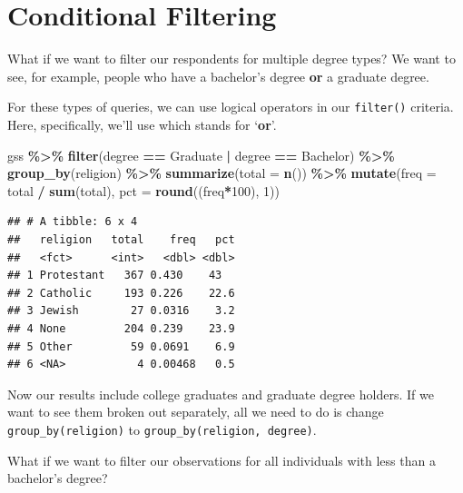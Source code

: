 \documentclass[
]{book}
\newenvironment{Shaded}{\begin{snugshade}}{\end{snugshade}}
\newcommand{\AttributeTok}[1]{\textcolor[rgb]{0.13,0.29,0.53}{#1}}
\newcommand{\DecValTok}[1]{\textcolor[rgb]{0.00,0.00,0.81}{#1}}
\newcommand{\FunctionTok}[1]{\textcolor[rgb]{0.13,0.29,0.53}{\textbf{#1}}}
\newcommand{\NormalTok}[1]{#1}
\newcommand{\SpecialCharTok}[1]{\textcolor[rgb]{0.81,0.36,0.00}{\textbf{#1}}}
\newcommand{\StringTok}[1]{\textcolor[rgb]{0.31,0.60,0.02}{#1}}
\begin{document}
\hypertarget{conditional-filtering}{%
\section{Conditional Filtering}\label{conditional-filtering}}

What if we want to filter our respondents for multiple degree types? We want to see, for example, people who have a bachelor's degree \textbf{or} a graduate degree.

For these types of queries, we can use logical operators in our \texttt{filter()} criteria. Here, specifically, we'll use \texttt{\textbar{}} which stands for `\textbf{or}'.

\begin{Shaded}
\begin{Highlighting}[]
\NormalTok{gss }\SpecialCharTok{\%\textgreater{}\%}
  \FunctionTok{filter}\NormalTok{(degree }\SpecialCharTok{==} \StringTok{\textquotesingle{}Graduate\textquotesingle{}} \SpecialCharTok{|}\NormalTok{ degree }\SpecialCharTok{==} \StringTok{\textquotesingle{}Bachelor\textquotesingle{}}\NormalTok{) }\SpecialCharTok{\%\textgreater{}\%}
  \FunctionTok{group\_by}\NormalTok{(religion) }\SpecialCharTok{\%\textgreater{}\%}
  \FunctionTok{summarize}\NormalTok{(}\AttributeTok{total =} \FunctionTok{n}\NormalTok{()) }\SpecialCharTok{\%\textgreater{}\%}
  \FunctionTok{mutate}\NormalTok{(}\AttributeTok{freq =}\NormalTok{ total }\SpecialCharTok{/} \FunctionTok{sum}\NormalTok{(total),}
         \AttributeTok{pct =} \FunctionTok{round}\NormalTok{((freq}\SpecialCharTok{*}\DecValTok{100}\NormalTok{), }\DecValTok{1}\NormalTok{))}
\end{Highlighting}
\end{Shaded}

\begin{verbatim}
## # A tibble: 6 x 4
##   religion   total    freq   pct
##   <fct>      <int>   <dbl> <dbl>
## 1 Protestant   367 0.430    43  
## 2 Catholic     193 0.226    22.6
## 3 Jewish        27 0.0316    3.2
## 4 None         204 0.239    23.9
## 5 Other         59 0.0691    6.9
## 6 <NA>           4 0.00468   0.5
\end{verbatim}

Now our results include college graduates and graduate degree holders. If we want to see them broken out separately, all we need to do is change \texttt{group\_by(religion)} to \texttt{group\_by(religion,\ degree)}.

What if we want to filter our observations for all individuals with less than a bachelor's degree?
\end{document}
